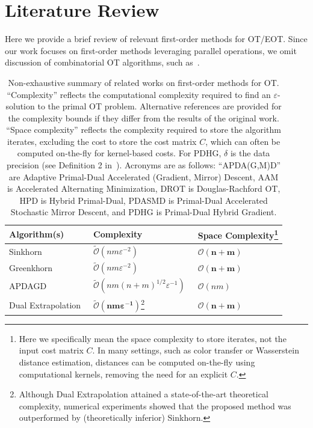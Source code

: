 \documentclass[10pt]{article}
\renewcommand{\O}{\mathcal{O}}
\newcommand{\tO}{\widetilde{\O}}
\theoremstyle{plain}
\theoremstyle{definition}
\theoremstyle{remark}
\begin{document}
\section{Literature Review}\label{app:review}
Here we provide a brief review of relevant first-order methods for OT/EOT. Since our work focuses on first-order methods leveraging parallel operations, we omit discussion of combinatorial OT algorithms, such as~\cite{lahn2019graph}.
\begin{table}[h]
    \caption{\footnotesize Non-exhaustive summary of related works on first-order methods for OT. ``Complexity'' reflects the computational complexity required to find an $\varepsilon$-solution to the primal OT problem. Alternative references are provided for the complexity bounds if they differ from the results of the original work. ``Space complexity'' reflects the complexity required to store the algorithm iterates, excluding the cost to store the cost matrix $C$, which can often be computed on-the-fly for kernel-based costs. For PDHG, $\delta$ is the data precision (see Definition 2 in~\cite{luPDOTPracticalPrimalDual2024}).
    Acronyms are as follows: ``APDA(G,M)D'' are Adaptive Primal-Dual Accelerated (Gradient, Mirror) Descent, AAM is Accelerated Alternating Minimization, DROT is Douglas-Rachford OT, HPD is Hybrid Primal-Dual, PDASMD is Primal-Dual Accelerated Stochastic Mirror Descent, and PDHG is Primal-Dual Hybrid Gradient. } 
    \label{tab:summary}
    \centering
    \begin{tabular}{|l|l|l|}\hline
        Algorithm(s) &  Complexity & Space Complexity\footnote{Here we specifically mean the space complexity to store iterates, not the input cost matrix $C$. In many settings, such as color transfer or Wasserstein distance estimation, distances can be computed on-the-fly using computational kernels, removing the need for an explicit $C$.} \\\hline\hline
         Sinkhorn~\cite{cuturiSinkhornDistancesLightspeed2013} & 
         $\tO(nm\varepsilon^{-2})$~\cite{dvurechenskyComputationalOptimalTransport2018} & $\bm{\mathcal{O}(n+m)}$ \\ 
        Greenkhorn~\cite{altschulerNearlinearTimeApproximation2017} & 
         $\tO(nm\varepsilon^{-2})$~\cite{linEfficiencyEntropicRegularized2022} & $\bm{\mathcal{O}(n+m)}$ \\ 
          APDAGD~\cite{dvurechenskyComputationalOptimalTransport2018} & $\tO(nm(n+m)^{1/2}\varepsilon^{-1})$~\cite{linEfficiencyEntropicRegularized2022} & $\mathcal{O}(nm)$ \\
         Dual Extrapolation~\cite{jambulapatiDirectTildelbraceOrbrace2019a}
           & $\bm{\tO(nm\varepsilon^{-1})}$\footnote{\label{note1}Although Dual Extrapolation attained a state-of-the-art theoretical complexity, numerical experiments showed that the proposed method was outperformed by (theoretically inferior) Sinkhorn.}  & $\bm{\mathcal{O}(n+m)}$\cite{assadiSemiStreamingBipartiteMatching2022} \\
        

\end{tabular}
\end{table}
\end{document}
